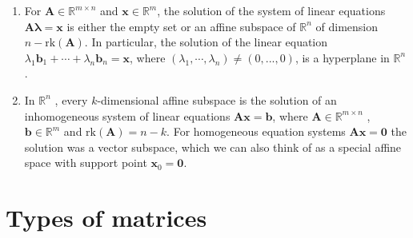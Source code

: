 \begin{enumerate}
    \item For $\bm{A} \in \mathbb{R}^{m\times n}$ and $\bm{x} \in \mathbb{R}^m$, the solution of the system of linear equations $\bm{A} \bm{\lambda}  = \bm{x}$ is either the empty set or an affine subspace of $\mathbb{R}^n$ of dimension $n - \text{rk}(\bm{A})$. 
    In particular, the solution of the linear equation $\lambda _1 \bm{b}_1 + \cdots + \lambda _n \bm{b}_n = \bm{x}$, where $(\lambda _1, \cdots , \lambda _n) \neq (0, . . . , 0)$, is a hyperplane in $\mathbb{R}^n$ .
    \hfill \cite{mfml/book/mml/Deisenroth-Faisal-Ong}

    \item In $\mathbb{R}^n$ , every $k$-dimensional affine subspace is the solution of an inhomogeneous system of linear equations $\bm{Ax} = \bm{b}$, where $\bm{A} \in \mathbb{R}^{m\times n}$ , $\bm{b} \in \mathbb{R}^m$ and $\text{rk}(\bm{A}) = n - k$. 
    For homogeneous equation systems $\bm{Ax} = \bm{0}$ the solution was a vector subspace, which we can also think of as a special affine space with support point $\bm{x}_0 = \bm{0}$.
    \hfill \cite{mfml/book/mml/Deisenroth-Faisal-Ong}
\end{enumerate}

























\section{Types of matrices}














